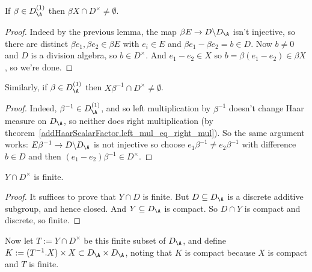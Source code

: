   \begin{lemma}
    \label{X_meets_kernel}
    If $\beta\in D_{\A}^{(1)}$ then
  $\beta X\cap D^\times\not=\emptyset$.
  \end{lemma}
  \begin{proof}
  Indeed by the previous lemma, the map $\beta E\to D\backslash D_{\A}$
  isn't injective, so there are distinct
  $\beta e_1,\beta e_2\in \beta E$ with $e_i\in E$ and
  $\beta e_1-\beta e_2=b\in D$.
  Now $b\not=0$ and $D$ is a division algebra, so $b\in D^\times$.
  And $e_1-e_2\in X$ so $b=\beta(e_1-e_2)\in \beta X$, so we're done.
\end{proof}

\begin{lemma}
  \label{X_meets_kernel'}
  Similarly, if $\beta\in D_{\A}^{(1)}$ then
  $X\beta^{-1}\cap D^\times\not=\emptyset$.
\end{lemma}
\begin{proof}
  Indeed, $\beta^{-1}\in D_{\A}^{(1)}$, and so left multiplication by $\beta^{-1}$
  doesn't change Haar measure on $D_{\A}$, so neither does right multiplication
  (by theorem~\ref{addHaarScalarFactor.left_mul_eq_right_mul}).
  So the same argument works: $E\beta^{-1}\to D\backslash D_{\A}$ is not
  injective so choose $e_1\beta^{-1}\not=e_2\beta^{-1}$ with difference $b\in D$
  and then $(e_1-e_2)\beta^{-1}\in D^\times$.
\end{proof}

\begin{lemma}
  \label{Y_meet_units_D}
  $Y\cap D^\times$ is finite.
\end{lemma}
\begin{proof}
  It suffices to prove that $Y\cap D$ is finite.
    But $D\subseteq D_{\A}$ is a discrete additive subgroup, and hence closed.
    And $Y\subseteq D_{\A}$ is compact.
    So $D\cap Y$ is compact and discrete, so finite.
\end{proof}

Now let $T:=Y\cap D^\times$ be this finite subset
of $D_{\A}$, and define $K:= (T^{-1}.X) \times X\subset D_{\A}\times D_{\A}$,
noting that $K$ is compact because $X$ is compact and $T$ is finite.

